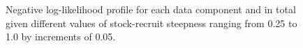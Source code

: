\documentclass[
]{scrartcl}
\begin{document}
\begin{figure}


\caption{\label{fig-steep-piner}Negative log-likelihood profile for each
data component and in total given different values of stock-recruit
steepness ranging from 0.25 to 1.0 by increments of 0.05.}

\end{figure}%
\end{document}
